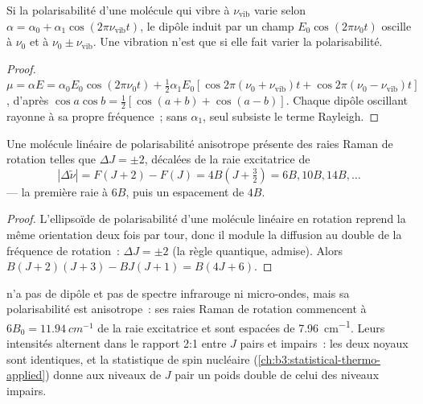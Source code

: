 \begin{proposition}\label{prop:b3:rovibrational-spectroscopy:raman-classical}
Si la polarisabilité d'une molécule qui vibre à $\nu_{\mathrm{vib}}$ varie
selon $\alpha = \alpha_0 + \alpha_1\cos(2\pi\nu_{\mathrm{vib}}t)$, le
dipôle induit par un
champ $E_0\cos(2\pi\nu_0t)$ oscille à $\nu_0$ et à $\nu_0 \pm \nu_{\mathrm{vib}}$.
Une vibration n'est  que si elle fait varier la
polarisabilité.
\end{proposition}

\begin{proof}
$\mu = \alpha E = \alpha_0E_0\cos(2\pi\nu_0t) + \frac12\alpha_1E_0[\cos2\pi(\nu_0 +
\nu_{\mathrm{vib}})t + \cos2\pi(\nu_0 - \nu_{\mathrm{vib}})t]$, d'après $\cos a\cos b =
\frac12[\cos(a+b) + \cos(a-b)]$. Chaque dipôle oscillant rayonne à sa
propre fréquence~; sans $\alpha_1$, seul subsiste le terme Rayleigh.
\end{proof}

\begin{proposition}\label{prop:b3:rovibrational-spectroscopy:rotational-raman}
Une molécule linéaire de polarisabilité anisotrope présente des raies
Raman de rotation telles que $\Delta J = \pm2$, décalées de la raie
excitatrice de
\[
|\Delta\tilde\nu| = F(J+2) - F(J) = 4B(J + \tfrac32) = 6B, 10B, 14B, \dots
\]
--- la première raie à $6B$, puis un espacement de $4B$.
\end{proposition}

\begin{proof}
L'ellipsoïde de polarisabilité d'une molécule linéaire en rotation
reprend la même orientation deux fois par tour, donc il module la
diffusion au double de la fréquence de rotation~: $\Delta J = \pm2$ (la
règle quantique, admise). Alors
$B(J+2)(J+3) - BJ(J+1) = B(4J + 6)$.
\end{proof}

\begin{example}\label{ex:b3:rovibrational-spectroscopy:n2}
 n'a pas de dipôle et pas de spectre infrarouge ni micro-ondes,
mais sa polarisabilité est anisotrope~: ses raies Raman de rotation
commencent à $6B_0 =
\qty{11.94}{cm^{-1}}$ de la raie excitatrice et sont espacées de
\qty{7.96}{cm^{-1}}. Leurs intensités alternent dans le rapport 2:1
entre $J$ pairs et impairs~: les deux noyaux  sont
identiques, et la statistique de spin nucléaire
(\cref{ch:b3:statistical-thermo-applied}) donne aux niveaux de $J$ pair
un poids double de celui des niveaux impairs.
\end{example}

